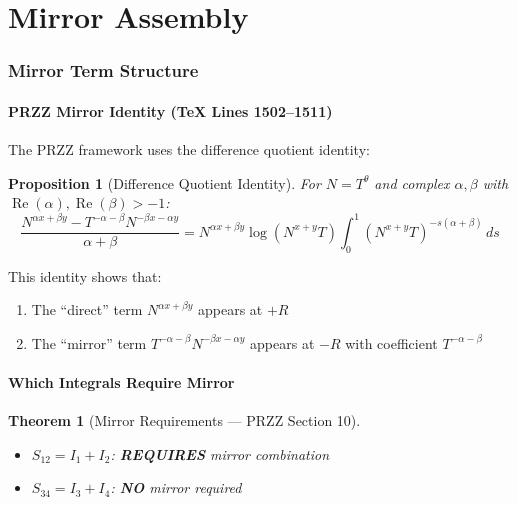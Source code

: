 \documentclass[11pt]{article}
\newtheorem{proposition}{Proposition}
\newtheorem{theorem}{Theorem}
\begin{document}

\part{Mirror Assembly}

\section{Mirror Term Structure}
\label{sec:mirror}

\subsection{PRZZ Mirror Identity (TeX Lines 1502--1511)}

The PRZZ framework uses the difference quotient identity:

\begin{proposition}[Difference Quotient Identity]
For $N = T^\theta$ and complex $\alpha, \beta$ with $\operatorname{Re}(\alpha), \operatorname{Re}(\beta) > -1$:
\begin{equation}
\boxed{
\frac{N^{\alpha x + \beta y} - T^{-\alpha-\beta} N^{-\beta x - \alpha y}}{\alpha + \beta}
= N^{\alpha x + \beta y} \log(N^{x+y}T) \int_0^1 (N^{x+y}T)^{-s(\alpha+\beta)} \, ds
}
\end{equation}
\end{proposition}

This identity shows that:
\begin{enumerate}
\item The ``direct'' term $N^{\alpha x + \beta y}$ appears at $+R$
\item The ``mirror'' term $T^{-\alpha-\beta} N^{-\beta x - \alpha y}$ appears at $-R$ with coefficient $T^{-\alpha-\beta}$
\end{enumerate}

\subsection{Which Integrals Require Mirror}

\begin{theorem}[Mirror Requirements --- PRZZ Section 10]
\begin{itemize}
\item $S_{12} = I_1 + I_2$: \textbf{REQUIRES} mirror combination
\item $S_{34} = I_3 + I_4$: \textbf{NO} mirror required
\end{itemize}
\end{theorem}
\end{document}
